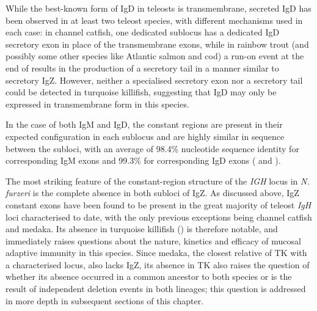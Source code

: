 	While the best-known form of IgD in teleosts is transmembrane, secreted IgD has been observed in at least two teleost species, with different mechanisms used in each case: in channel catfish, one dedicated sublocus has a dedicated IgD secretory exon in place of the transmembrane exons, while in rainbow trout (and possibly some other species like Atlantic salmon and cod) a run-on event at the end of  results in the production of a secretory tail in a manner similar to secretory IgZ. However, neither a specialised secretory exon nor a  secretory tail could be detected in turquoise killifish, suggesting that IgD may only be expressed in transmembrane form in this species. %
	
	In the case of both IgM and IgD, the constant regions are present in their expected configuration in each sublocus and are highly similar in sequence between the subloci, with an average of 98.4\% nucleotide sequence identity for corresponding IgM exons and 99.3\% for corresponding IgD exons ( and ).

	The most striking feature of the constant-region structure of the \textit{IGH} locus in \textit{N. furzeri} is the complete absence in both subloci of IgZ. As discussed above, IgZ constant exons have been found to be present in the great majority of teleost \textit{IgH} loci characterised to date, with the only previous exceptions being channel catfish and medaka. Its absence in turquoise killifish () is therefore notable, and immediately raises questions about the nature, kinetics and efficacy of mucosal adaptive immunity in this species. Since medaka, the closest relative of TK with a characterised locus, also lacks IgZ, its absence in TK also raises the question of whether its absence occurred in a common ancestor to both species or is the result of independent deletion events in both lineages; this question is addressed in more depth in subsequent sections of this chapter. %
		

	
